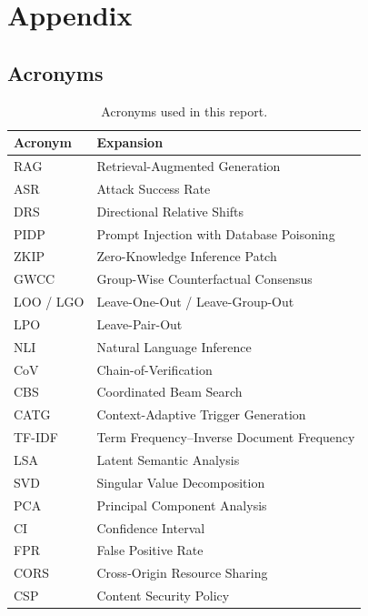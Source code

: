 \appendix
\section*{Appendix}
\renewcommand{\thesubsection}{\Alph{subsection}}

\subsection{Acronyms}

\begin{table}[htbp]
\centering
\small
\begin{tabularx}{0.75\textwidth}{@{}l Y@{}}
\toprule
\textbf{Acronym} & \textbf{Expansion} \\
\midrule
RAG & Retrieval-Augmented Generation \\
ASR & Attack Success Rate \\
DRS & Directional Relative Shifts \\
PIDP & Prompt Injection with Database Poisoning \\
ZKIP & Zero-Knowledge Inference Patch \\
GWCC & Group-Wise Counterfactual Consensus \\
LOO / LGO & Leave-One-Out / Leave-Group-Out \\
LPO & Leave-Pair-Out \\
NLI & Natural Language Inference \\
CoV & Chain-of-Verification \\
CBS & Coordinated Beam Search \\
CATG & Context-Adaptive Trigger Generation \\
TF-IDF & Term Frequency--Inverse Document Frequency \\
LSA & Latent Semantic Analysis \\
SVD & Singular Value Decomposition \\
PCA & Principal Component Analysis \\
CI & Confidence Interval \\
FPR & False Positive Rate \\
CORS & Cross-Origin Resource Sharing \\
CSP & Content Security Policy \\
\bottomrule
\end{tabularx}
\caption{Acronyms used in this report.}
\label{tab:acronyms}
\end{table}

